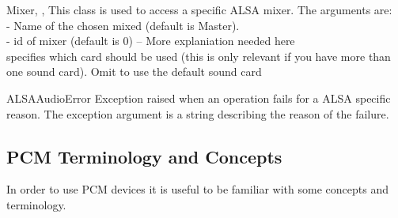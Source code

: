 \begin{classdesc}{Mixer}{, , }
This class is used to access a specific ALSA mixer.
The arguments are: \\
 - Name of the chosen mixed (default is Master). \\
 - id of mixer (default is 0) -- More explaniation needed here\\
 specifies which card should be used (this is only relevant 
if you have more than one sound card). Omit to use the default sound card
\end{classdesc}


\begin{excdesc}{ALSAAudioError}
Exception raised when an operation fails for a ALSA specific reason.
The exception argument is a string describing the reason of the
failure.
\end{excdesc}

\subsection{PCM Terminology and Concepts}

In order to use PCM devices it is useful to be familiar with some concepts and
terminology.

